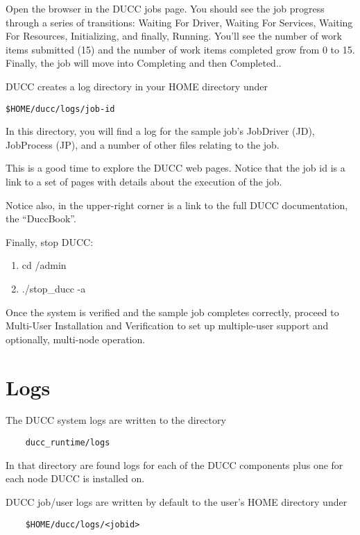     Open the browser in the DUCC jobs page.  You should see the job progress through a series of
    transitions: Waiting For Driver, Waiting For Services, Waiting For Resources, Initializing, and
    finally, Running.  You'll see the number of work items submitted (15) and the number of work
    items completed grow from 0 to 15.  Finally, the job will move into Completing and then
    Completed..

    DUCC creates a log directory in your HOME directory under 
\begin{verbatim}
$HOME/ducc/logs/job-id
\end{verbatim}

    In this directory, you will find a log for the sample job's JobDriver (JD), JobProcess (JP), and
    a number of other files relating to the job.

    This is a good time to explore the DUCC web pages.  Notice that the job id is a link to a set of
    pages with details about the execution of the job.

    Notice also, in the upper-right corner is a link to the full DUCC documentation, the ``DuccBook''.

    Finally, stop DUCC:
    \begin{enumerate}
      \item cd \duccruntime/admin
      \item./stop\_ducc -a
      \end{enumerate}
      
      Once the system is verified and the sample job completes correctly, proceed to Multi-User
      Installation and Verification to set up multiple-user support and optionally, multi-node
      operation.

\section{Logs}
    The DUCC system logs are written to the directory
\begin{verbatim}
    ducc_runtime/logs
\end{verbatim}

    In that directory are found logs for each of the DUCC components plus one for each node DUCC is
    installed on.

    DUCC job/user logs are written by default to the user's HOME directory under
\begin{verbatim}
    $HOME/ducc/logs/<jobid>
\end{verbatim}

